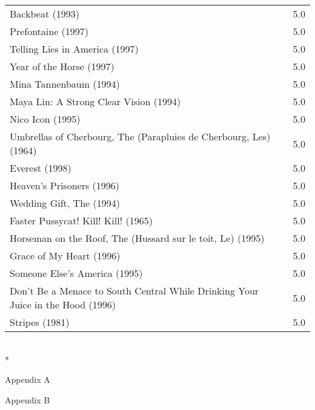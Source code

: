 \documentclass{article}
\begin{document}
\begin{tabular}{ l r }
Backbeat (1993)  & 5.0 \\
Prefontaine (1997)  & 5.0 \\
Telling Lies in America (1997)  & 5.0 \\
Year of the Horse (1997)  & 5.0 \\
Mina Tannenbaum (1994)  & 5.0 \\
Maya Lin: A Strong Clear Vision (1994)  & 5.0 \\
Nico Icon (1995)  & 5.0 \\
Umbrellas of Cherbourg, The (Parapluies de Cherbourg, Les) (1964)  & 5.0 \\
Everest (1998)  & 5.0 \\
Heaven's Prisoners (1996)  & 5.0 \\
Wedding Gift, The (1994)  & 5.0 \\
Faster Pussycat! Kill! Kill! (1965)  & 5.0 \\
Horseman on the Roof, The (Hussard sur le toit, Le) (1995)  & 5.0 \\
Grace of My Heart (1996)  & 5.0 \\
Someone Else's America (1995)  & 5.0 \\
Don't Be a Menace to South Central While Drinking Your Juice in the Hood (1996)  & 5.0 \\
Stripes (1981)  & 5.0 \\
\end{tabular}
\\*

\appendix
\newpage
Appendix A


\newpage
Appendix B

\end{document}
